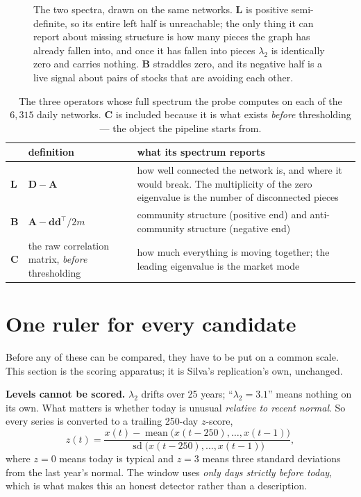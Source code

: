 \documentclass[11pt,a4paper]{article}
\newcommand{\Lap}{\mathbf{L}}
\newcommand{\Amat}{\mathbf{A}}
\newcommand{\Bmat}{\mathbf{B}}
\newcommand{\Cmat}{\mathbf{C}}
\newcommand{\dvec}{\mathbf{d}}
\begin{document}
\begin{figure}[t]
\caption{The two spectra, drawn on the same networks. $\Lap$ is positive
semi-definite, so its entire left half is unreachable; the only thing it can
report about missing structure is how many pieces the graph has already fallen
into, and once it has fallen into pieces $\lambda_2$ is identically zero and
carries nothing. $\Bmat$ straddles zero, and its negative half is a live signal
about pairs of stocks that are avoiding each other.}
\label{fig:spectra}
\end{figure}

\begin{table}[h]
\centering\small
\caption{The three operators whose full spectrum the probe computes on each of
the $6{,}315$ daily networks. $\Cmat$ is included because it is what exists
\emph{before} thresholding --- the object the pipeline starts from.}
\label{tab:operators}
\begin{tabular}{@{}llp{78mm}@{}}
\toprule
& definition & what its spectrum reports \\
\midrule
$\Lap$ & $\mathbf{D}-\Amat$ & how well connected the network is, and where it
would break. The multiplicity of the zero eigenvalue is the number of
disconnected pieces \\[3pt]
$\Bmat$ & $\Amat-\dvec\dvec^{\!\top}\!/2m$ & community structure (positive end)
and anti-community structure (negative end) \\[3pt]
$\Cmat$ & the raw correlation matrix, \emph{before} thresholding & how much
everything is moving together; the leading eigenvalue is the market mode \\
\bottomrule
\end{tabular}
\end{table}

\section{One ruler for every candidate}
\label{sec:ruler}

Before any of these can be compared, they have to be put on a common scale.
This section is the scoring apparatus; it is Silva's replication's own, unchanged.

\textbf{Levels cannot be scored.} $\lambda_2$ drifts over 25 years; ``$\lambda_2
= 3.1$'' means nothing on its own. What matters is whether today is unusual
\emph{relative to recent normal}. So every series is converted to a trailing
250-day $z$-score,
\[
  z(t)=\frac{x(t)-\operatorname{mean}\big(x(t-250),\dots,x(t-1)\big)}
             {\operatorname{sd}\big(x(t-250),\dots,x(t-1)\big)},
\]
where $z=0$ means today is typical and $z=3$ means three standard deviations
from the last year's normal. The window uses \emph{only days strictly before
today}, which is what makes this an honest detector rather than a description.
\end{document}
